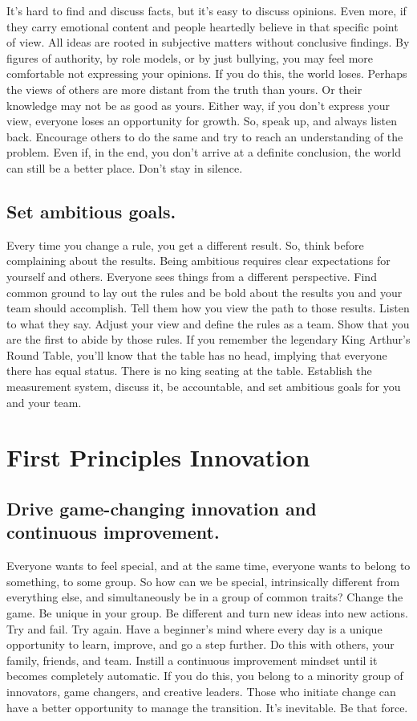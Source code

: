 \documentclass[10pt,a4paper]{book}
\begin{document}
It's hard to find and discuss facts, but it's easy to discuss opinions. Even more, if they carry emotional content and people heartedly believe in that specific point of view. All ideas are rooted in subjective matters without conclusive findings. By figures of authority, by role models, or by just bullying, you may feel more comfortable not expressing your opinions. If you do this, the world loses. Perhaps the views of others are more distant from the truth than yours. Or their knowledge may not be as good as yours. Either way, if you don't express your view, everyone loses an opportunity for growth. So, speak up, and always listen back. Encourage others to do the same and try to reach an understanding of the problem. Even if, in the end, you don't arrive at a definite conclusion, the world can still be a better place. Don't stay in silence.

\section{Set ambitious goals.}

Every time you change a rule, you get a different result. So, think before complaining about the results. Being ambitious requires clear expectations for yourself and others. Everyone sees things from a different perspective. Find common ground to lay out the rules and be bold about the results you and your team should accomplish. Tell them how you view the path to those results. Listen to what they say. Adjust your view and define the rules as a team. Show that you are the first to abide by those rules. If you remember the legendary King Arthur's Round Table, you'll know that the table has no head, implying that everyone there has equal status. There is no king seating at the table. Establish the measurement system, discuss it, be accountable, and set ambitious goals for you and your team.

\chapter{First Principles Innovation}

\section{Drive game-changing innovation and continuous improvement.}

Everyone wants to feel special, and at the same time, everyone wants to belong to something, to some group. So how can we be special, intrinsically different from everything else, and simultaneously be in a group of common traits? Change the game. Be unique in your group. Be different and turn new ideas into new actions. Try and fail. Try again. Have a beginner's mind where every day is a unique opportunity to learn, improve, and go a step further. Do this with others, your family, friends, and team. Instill a continuous improvement mindset until it becomes completely automatic. If you do this, you belong to a minority group of innovators, game changers, and creative leaders. Those who initiate change can have a better opportunity to manage the transition. It's inevitable. Be that force.
\end{document}
